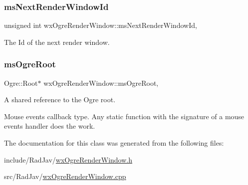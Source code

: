 \subsubsection{\texorpdfstring{ms\+Next\+Render\+Window\+Id}{msNextRenderWindowId}}
{\footnotesize\ttfamily unsigned int wx\+Ogre\+Render\+Window\+::ms\+Next\+Render\+Window\+Id\hspace{0.3cm}{\ttfamily [static]}, {\ttfamily [protected]}}



The Id of the next render window. 

\mbox{\label{classwx_ogre_render_window_aeb1475a166966aa151cbfc71bb4dfe60}} 
\subsubsection{\texorpdfstring{ms\+Ogre\+Root}{msOgreRoot}}
{\footnotesize\ttfamily Ogre\+::\+Root$\ast$ wx\+Ogre\+Render\+Window\+::ms\+Ogre\+Root\hspace{0.3cm}{\ttfamily [static]}, {\ttfamily [protected]}}



A shared reference to the Ogre root. 

Mouse events callback type. Any static function with the signature of a mouse events handler does the work. 

The documentation for this class was generated from the following files\+:\begin{DoxyCompactItemize}
\item 
include/\+Rad\+Jav/\mbox{\hyperlink{wx_ogre_render_window_8h}{wx\+Ogre\+Render\+Window.\+h}}\item 
src/\+Rad\+Jav/\mbox{\hyperlink{wx_ogre_render_window_8cpp}{wx\+Ogre\+Render\+Window.\+cpp}}\end{DoxyCompactItemize}
